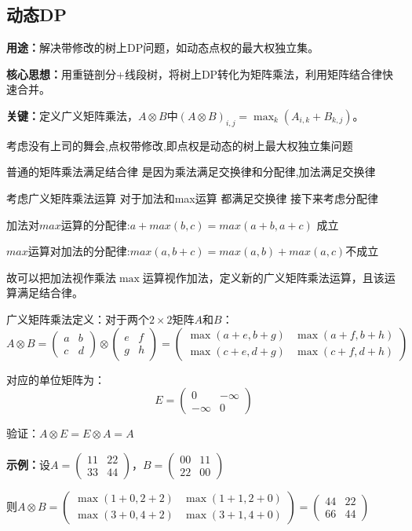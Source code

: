 \documentclass[a4paper, fontset=none]{ctexart}
\begin{document}
\subsection{动态DP}
\textbf{用途：}解决带修改的树上DP问题，如动态点权的最大权独立集。

\textbf{核心思想：}用重链剖分+线段树，将树上DP转化为矩阵乘法，利用矩阵结合律快速合并。

\textbf{关键：}定义广义矩阵乘法，$A \otimes B$中$(A \otimes B)_{i, j} = \max_k(A_{i, k} + B_{k, j})$。

考虑没有上司的舞会,点权带修改,即点权是动态的树上最大权独立集问题

普通的矩阵乘法满足结合律 是因为乘法满足交换律和分配律,加法满足交换律

考虑广义矩阵乘法运算 对于加法和max运算 都满足交换律 接下来考虑分配律

加法对$max$运算的分配律:$a+max(b, c)=max(a+b, a+c)$ 成立

$max$运算对加法的分配律:$max(a, b+c)=max(a, b)+max(a, c)$不成立

故可以把加法视作乘法$\max$运算视作加法，定义新的广义矩阵乘法运算，且该运算满足结合律。

广义矩阵乘法定义：对于两个$2 \times 2$矩阵$A$和$B$：
$$A \otimes B = \begin{pmatrix}a&b\\c&d\end{pmatrix} \otimes \begin{pmatrix}e&f\\g&h\end{pmatrix} = \begin{pmatrix}\max(a+e, b+g) & \max(a+f, b+h) \\ \max(c+e, d+g) & \max(c+f, d+h)\end{pmatrix}$$

对应的单位矩阵为：
$$E = \begin{pmatrix}0 & -\infty \\ -\infty & 0\end{pmatrix}$$

验证：$A \otimes E = E \otimes A = A$

\textbf{示例：}设$A = \begin{pmatrix}1 1&2 2\\3 3&4 4\end{pmatrix}$，$B = \begin{pmatrix}0 0&1 1\\2 2&0 0\end{pmatrix}$

则$A \otimes B = \begin{pmatrix}\max(1+0, 2+2) & \max(1+1, 2+0) \\ \max(3+0, 4+2) & \max(3+1, 4+0)\end{pmatrix} = \begin{pmatrix}4 4&2 2\\6 6&4 4\end{pmatrix}$
\end{document}
